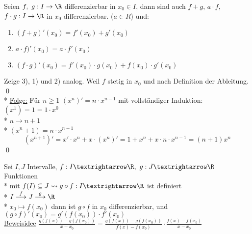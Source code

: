 Seien $f,\ g: I \to \R$ differenzierbar in $x_0 \in I$, dann sind auch $f + g$, $a \cdot f$, $f \cdot g: I \to \R$ in $x_0$ differenzierbar. ($a \in R$) und:
\begin{enumerate}
\item{$(f + g)'(x_0) = f'(x_0) + g'(x_0)$}
\item{$a \cdot f)'(x_0) = a \cdot f'(x_0)$}
\item{$(f \cdot g)'(x_0) = f'(x_0) \cdot g(x_0) + f(x_0) \cdot g'(x_0)$}
\end{enumerate}
\bew
Zeige 3), 1) und 2) analog.
Weil $f$ stetig in $x_0$ und nach Definition der Ableitung. \qed{}\\*
\ul{Folge:} Für $n \geq 1$ $(x^n)' = n \cdot x^{n-1}$
\bew
mit vollständiger Induktion:
$(x^1) = 1 =1 \cdot x^0$ \ok\\*
$n \to n + 1$\\*
$(x^n+1) = n\cdot x^{n-1}$
$$(x^{n+1})' = x' \cdot x^n + x \cdot (x^n)' = 1 + x^n + x \cdot n \cdot x^{n-1} = (n+1) x^n$$\qed

Sei $I,J$ Intervalle, $f:I→\R,\ g:J→\R$ Funktionen\\*
mit $f(I)\subseteq J \leadsto g\circ f:I→\R$ ist definiert\\*
$I\stackrel{f}{\longrightarrow}J\stackrel{g}{\longrightarrow}\R$\\*
$x_0\longmapsto f(x_0)$
dann ist $g\circ f$ in $x_0$ differenzierbar,
und $(g\circ f)'(x_0)=g'(f(x_0))·f'(x_0)$\\
\ul{Beweisidee} $\frac{g(f(x)) - g(f(x_0))}{x-x_0} = \frac{g(f(x)) - g(f(x_0))}{f(x)-f(x_0)} \cdot \frac{f(x) - f(x_0)}{x-x_0}$